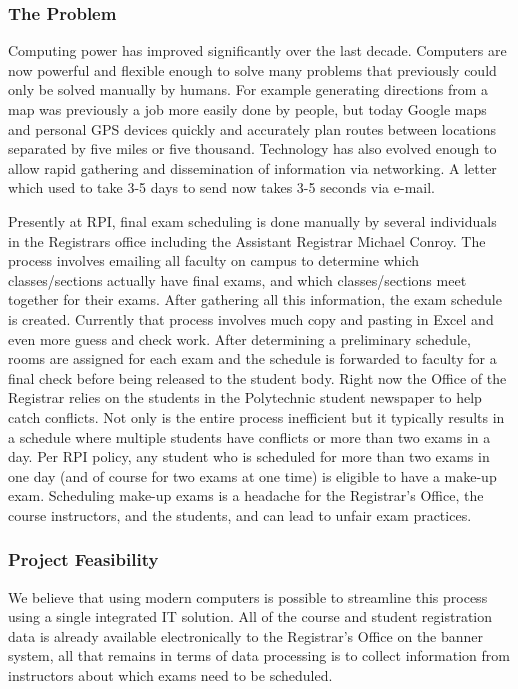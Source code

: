 \documentclass[11pt]{article}
\begin{document}
\subsubsection*{The Problem}
Computing power has improved significantly over the last decade.  Computers are now powerful and flexible enough to solve many problems that previously could only be solved manually by humans.  For example generating directions from a map was previously a job more easily done by people, but today Google maps and personal GPS devices quickly and accurately plan routes between locations separated by five miles or five thousand.  Technology has also evolved enough to allow rapid gathering and dissemination of information via networking.  A letter which used to take 3-5 days to send now takes  3-5 seconds via e-mail.

\par Presently at RPI, final exam scheduling is done manually by several individuals in the Registrars office including the Assistant Registrar Michael Conroy.  The process involves emailing all faculty on campus to determine which classes/sections actually have final exams, and which classes/sections meet together for their exams.  After gathering all this information, the exam schedule is created.  Currently that process involves much copy and pasting in Excel and even more guess and check work.  After determining a preliminary schedule, rooms are assigned for each exam and the schedule is forwarded to faculty for a final check before being released to the student body.  Right now the Office of the Registrar relies on the students in the Polytechnic student newspaper to help catch conflicts.  Not only is the entire process inefficient but it typically results in a schedule where multiple students have conflicts or more than two exams in a day.  Per RPI policy, any student who is scheduled for more than two exams in one day (and of course for two exams at one time) is eligible to have a make-up exam. Scheduling make-up exams is a headache for the Registrar's Office, the course instructors, and the students, and can lead to unfair exam practices.

\subsubsection*{Project Feasibility}
\par We believe that using modern computers is possible to streamline this process using a single integrated IT solution.  All of the course and student registration data is already available electronically to the Registrar's Office on the banner system, all that remains in terms of data processing is to collect information from instructors about which exams need to be scheduled.
\end{document}
